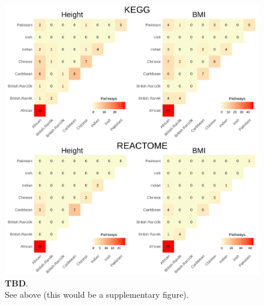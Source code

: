 \documentclass[12pt, a4paper]{article}
\begin{document}
\begin{figure}[htbp]
\centering
\includegraphics[scale=.225]{Images/Supp/InterPath_Supp_Figure_Heatplots_Allpaths_vs2.png}
\caption[TBD]{\textbf{TBD}. \\ See above (this would be a supplementary figure).}
\label{InterPath-Supp-Figure-Heatplots-AllPaths}
\end{figure}
\clearpage

\end{document}
